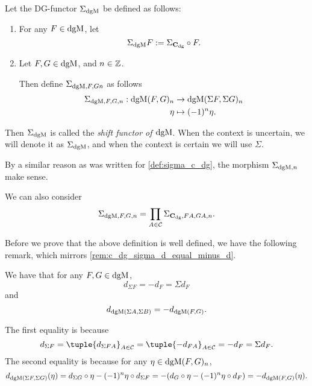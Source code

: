 \begin{definition}
    \label{def:sigma_dgmod}
    Let the DG-functor \( \Sigma_{\operatorname{dgM}} \) be defined as follows:
    \begin{enumerate}
        \item {
            For any \( F \in \operatorname{dgM} \), let
            \[
                \Sigma_{\operatorname{dgM}} F := \Sigma_{\operatorname{\mathbf{C}}_{\operatorname{dg}}} \circ F.
            \]
        }
        \item {
            Let \( F, G \in \operatorname{dgM} \), and \( n \in {\mathbb{Z}} \).
            
            Then define \( \Sigma_{\operatorname{dgM}, F, G n} \) as follows
            \begin{align*}
                \Sigma_{\operatorname{dgM}, F, G, n}: \operatorname{dgM}(F, G)_n &\to \operatorname{dgM}(\Sigma F, \Sigma G)_n \\
                \eta &\mapsto (-1)^n \eta.
            \end{align*}
        }
    \end{enumerate}
    Then \( \Sigma_{\operatorname{dgM}} \) is called the \emph{shift functor of \( \operatorname{dgM} \)}. When the context is uncertain, we will denote it as \( \Sigma_{\operatorname{dgM}} \), and when the context is certain we will use \( \Sigma \).
\end{definition}

By a similar reason as was written for \autoref{def:sigma_c_dg}, the morphism \( \Sigma_{\operatorname{dgM}, n} \) make sense.

We can also consider
\[
    \Sigma_{\operatorname{dgM}, F, G, n} = \prod_{A \in {\mathcal{C}}} \Sigma_{\operatorname{\mathbf{C}}_{\operatorname{dg}}, F A, G A, n}.
\] 

Before we prove that the above definition is well defined, we have the following remark, which mirrors \autoref{rem:c_dg_sigma_d_equal_minus_d}.

\begin{remark}
    We have that for any \( F, G \in \operatorname{dgM} \),
    \[
        d_{\Sigma F} = -d_F = \Sigma d_F
    \]
    and
    \[
        d_{\operatorname{dgM}(\Sigma A, \Sigma B)} = - d_{\operatorname{dgM}(F, G)}.
    \]

    The first equality is because
    \[
        d_{\Sigma F} = \tuple{d_{\Sigma F A}}_{A \in \Cc} = \tuple{-d_{F A}}_{A \in \Cc} = - d_F = \Sigma d_F.
    \]
    The second equality is because for any \( \eta \in \operatorname{dgM}(F, G)_n \),
    \[
        d_{\operatorname{dgM}(\Sigma F, \Sigma G)} (\eta) = d_{\Sigma G} \circ \eta - (-1)^n \eta \circ d_{\Sigma F} = - (d_G \circ \eta - (-1)^n \eta \circ d_F) = - d_{\operatorname{dgM}(F, G)} (\eta).
    \]
\end{remark}

